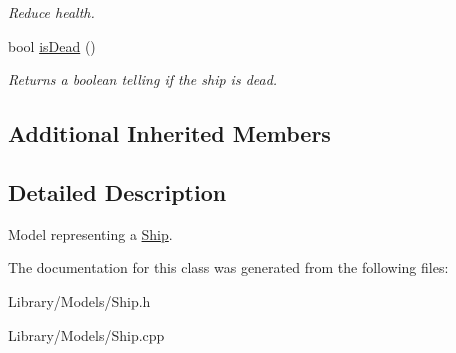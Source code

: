 \begin{DoxyCompactItemize}
\begin{DoxyCompactList}\small\item\em Reduce health. \end{DoxyCompactList}\item 
\hypertarget{classty_lib_1_1_ship_a5e58d9bb9a39ff35141c90d29ee51728}{}bool \hyperlink{classty_lib_1_1_ship_a5e58d9bb9a39ff35141c90d29ee51728}{is\+Dead} ()\label{classty_lib_1_1_ship_a5e58d9bb9a39ff35141c90d29ee51728}

\begin{DoxyCompactList}\small\item\em Returns a boolean telling if the ship is dead. \end{DoxyCompactList}\end{DoxyCompactItemize}
\subsection*{Additional Inherited Members}


\subsection{Detailed Description}
Model representing a \hyperlink{classty_lib_1_1_ship}{Ship}. 

The documentation for this class was generated from the following files\+:\begin{DoxyCompactItemize}
\item 
Library/\+Models/Ship.\+h\item 
Library/\+Models/Ship.\+cpp\end{DoxyCompactItemize}
